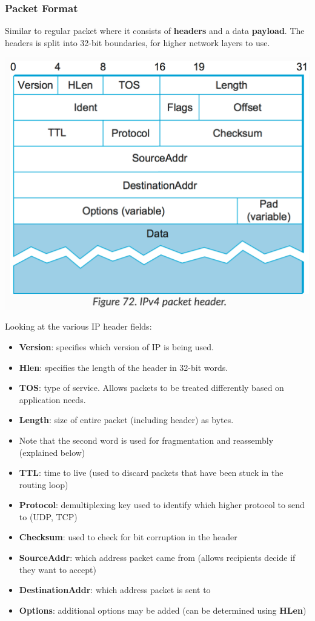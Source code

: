 \documentclass{article}
\begin{document}
  \subsubsection{Packet Format}
  Similar to regular packet where it consists of \textbf{headers} and a data \textbf{payload}. The headers is split into 32-bit boundaries, for higher network layers to use.
  \begin{center}
    \includegraphics[scale=0.4]{IPv4PacketHeader}
  \end{center}
  Looking at the various IP header fields:
  \begin{itemize}
    \item \textbf{Version}: specifies which version of IP is being used. 
    \item \textbf{Hlen}: specifies the length of the header in 32-bit words.
    \item \textbf{TOS}: type of service. Allows packets to be treated differently based on application needs.
    \item \textbf{Length}: size of entire packet (including header) as bytes.
    \item Note that the second word is used for fragmentation and reassembly (explained below)
    \item \textbf{TTL}: time to live (used to discard packets that have been stuck in the routing loop)
    \item \textbf{Protocol}: demultiplexing key used to identify which higher protocol to send to (UDP, TCP)
    \item \textbf{Checksum}: used to check for bit corruption in the header
    \item \textbf{SourceAddr}: which address packet came from (allows recipients decide if they want to accept)
    \item \textbf{DestinationAddr}: which address packet is sent to
    \item \textbf{Options}: additional options may be added (can be determined using \textbf{HLen})
  \end{itemize}
\end{document}
